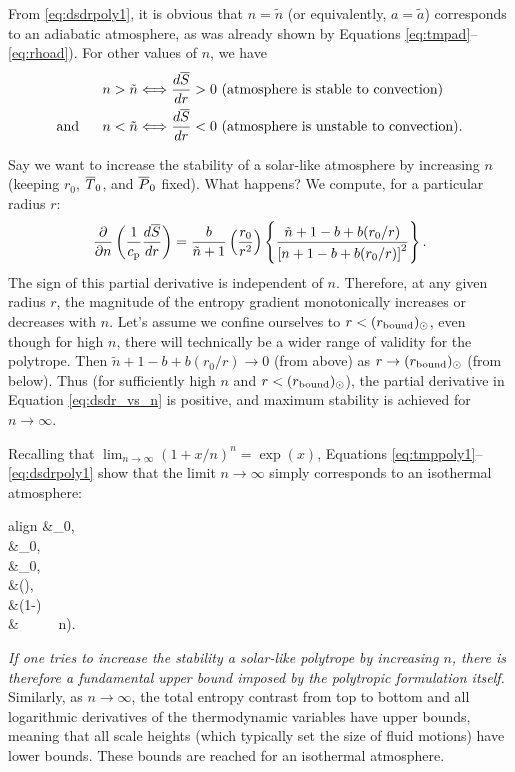 \documentclass[12pt]{article}
\newcommand{\rbound}{r_{\rm{bound}}}
\begin{document}
From \eqref{eq:dsdrpoly1}, it is obvious that $n=\tilde{n}$ (or equivalently, $a=\tilde{a}$) corresponds to an adiabatic atmosphere, as was already shown by Equations \eqref{eq:tmpad}--\eqref{eq:rhoad}). For other values of $n$, we have
\begin{align}
&n > \tilde{n} \Longleftrightarrow \frac{d\overline{S}}{dr} > 0 \text{ (atmosphere is stable to convection)}\\
\text{and}\ \ \ \ \  &n < \tilde{n} \Longleftrightarrow \frac{d\overline{S}}{dr} < 0 \text{ (atmosphere is unstable to convection).}
\end{align}

Say we want to increase the stability of a solar-like atmosphere by increasing $n$ (keeping $r_0$, $\overline{T}_0$, and $\overline{P}_0$ fixed). What happens? We compute, for a particular radius $r$:
\begin{align}\label{eq:dsdr_vs_n}
	\frac{\partial}{\partial n}\left(\frac{1}{c_{\rm{p}}}\frac{d\overline{S}}{dr}\right)=  \frac{b}{\tilde{n}+1}\left(\frac{r_0}{r^2}\right)  \left\{\frac{\tilde{n}+1-b+b(r_0/r)}{\left[n+1-b+b(r_0/r)\right]^2}\right\}. 
\end{align}
The sign of this partial derivative is independent of $n$. Therefore, at any given radius $r$, the magnitude of the entropy gradient monotonically increases or decreases with $n$. Let's assume we confine ourselves to $r<(\rbound)_\odot$, even though for high $n$, there will technically be a wider range of validity for the polytrope. Then $\tilde{n}+1-b+b(r_0/r)\rightarrow0$ (from above) as $r\rightarrow(\rbound)_\odot$ (from below). Thus (for sufficiently high $n$ and $r<(\rbound)_\odot$), the partial derivative in Equation \eqref{eq:dsdr_vs_n} is positive, and maximum stability is achieved for $n\rightarrow\infty$. 

Recalling that $\lim_{n\rightarrow\infty}(1+x/n)^n=\exp(x)$, Equations \eqref{eq:tmppoly1}--\eqref{eq:dsdrpoly1} show that the limit $n\rightarrow\infty$ simply corresponds to an isothermal atmosphere:
	\begin{empheq}[box=\fbox]{align}\label{eq:limitninfty}
\tmpref\ofr&\rightarrow \tmpref_0, \\
\prsref\ofr&\rightarrow \prsref_0,\\
\rhoref\ofr&\rightarrow \rhoref_0,\\
\dsdr &\rightarrow {}\left(\right),\\
 \andd \frac{\sref\ofr}{\cp} &\rightarrow {}\left(1-\right)\\ 
 &\ \ \ \ \  n\rightarrow\infty). \nonumber
\end{empheq}
\textit{If one tries to increase the stability a solar-like polytrope by increasing $n$, there is therefore a fundamental upper bound imposed by the polytropic formulation itself.}
Similarly, as $n\rightarrow\infty$, the total entropy contrast from top to bottom and all logarithmic derivatives of the thermodynamic variables have upper bounds, meaning that all scale heights (which typically set the size of fluid motions) have lower bounds. These bounds are reached for an isothermal atmosphere.
\end{document}
